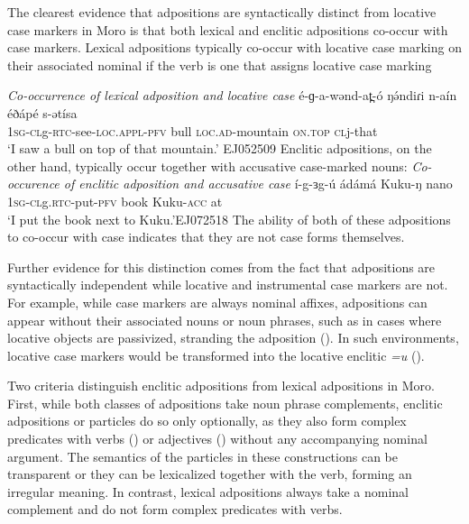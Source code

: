 The clearest evidence that adpositions are syntactically distinct from locative case markers in Moro is that both lexical and enclitic adpositions co-occur with case markers. Lexical adpositions typically co-occur with locative case marking on their associated nominal if the verb is one that assigns locative case marking

\ea \textit{Co-occurrence of lexical adposition and locative case}
\gll é-ɡ-a-wənd-at̪-ó	ŋə́ndiɾi		n-aín		éðápé	s-ətísa\\
	\textsc{1sg-cl}g-\textsc{rtc}-see-\textsc{loc.appl-pfv} bull		\textsc{loc.ad}-mountain	\textsc{on.top} 	\textsc{cl}j-that\\
\glt	`I saw a bull on top of that mountain.' \hfill EJ052509 
\z%
Enclitic adpositions, on the other hand, typically occur together with accusative case-marked nouns:
\ea \textit{Co-occurence of enclitic adposition and accusative case}
\gll í-g-ɜg-ú ádámá Kuku-ŋ nano\\
\textsc{1sg-cl}g.\textsc{rtc}-put-\textsc{pfv} book Kuku-\textsc{acc} at\\
\glt `I put the book next to Kuku.'\hfill EJ072518
\z  %
The ability of both of these adpositions to co-occur with case indicates that they are not case forms themselves.

Further evidence for this distinction comes from the fact that adpositions are syntactically independent while locative and instrumental case markers are not. For example, while case markers are always nominal affixes, adpositions can appear without their associated nouns or noun phrases, such as in cases where locative objects are passivized, stranding the adposition (). In such environments, locative case markers would be transformed into the locative enclitic \textit{=u} (). 

Two criteria distinguish enclitic adpositions from lexical adpositions in Moro. First, while both classes of adpositions take noun phrase complements, enclitic adpositions or particles do so only optionally, as they also form complex predicates with verbs () or adjectives () without any accompanying nominal argument. The semantics of the particles in these constructions can be transparent or they can be lexicalized together with the verb, forming an irregular meaning. In contrast, lexical adpositions always take a nominal complement and do not form complex predicates with verbs.

